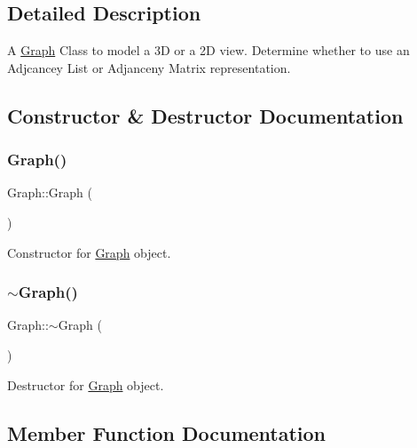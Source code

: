 \subsection{Detailed Description}
A \mbox{\hyperlink{class_graph}{Graph}} Class to model a 3D or a 2D view. Determine whether to use an Adjcancey List or Adjanceny Matrix representation. 

\subsection{Constructor \& Destructor Documentation}
\mbox{\label{class_graph_ae4c72b8ac4d693c49800a4c7e273654f}} 
\subsubsection{\texorpdfstring{Graph()}{Graph()}}
{\footnotesize\ttfamily Graph\+::\+Graph (\begin{DoxyParamCaption}{ }\end{DoxyParamCaption})}



Constructor for \mbox{\hyperlink{class_graph}{Graph}} object. 

\mbox{\label{class_graph_a902c5b3eacb66d60752525ab23297a95}} 
\subsubsection{\texorpdfstring{$\sim$\+Graph()}{~Graph()}}
{\footnotesize\ttfamily Graph\+::$\sim$\+Graph (\begin{DoxyParamCaption}{ }\end{DoxyParamCaption})}



Destructor for \mbox{\hyperlink{class_graph}{Graph}} object. 



\subsection{Member Function Documentation}
\mbox{\label{class_graph_a5c30bae1d7a0bbb2f9d9f0d5ad40f78f}} 
